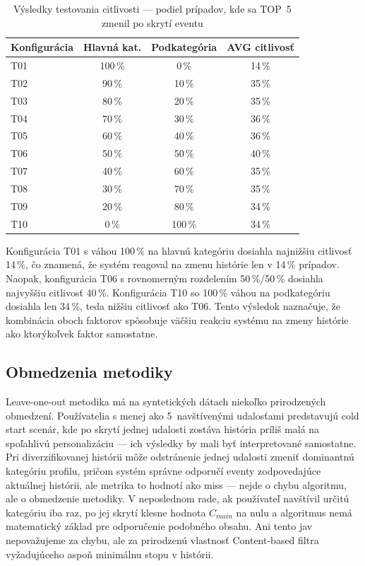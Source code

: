 \begin{table}[h]
\centering
\begin{tabular}{|l|c|c|c|}
\hline
\textbf{Konfigurácia} & \textbf{Hlavná kat.} & \textbf{Podkategória} & \textbf{AVG citlivosť} \\
\hline
T01 & 100\,\% & 0\,\%   & 14\,\% \\
T02 & 90\,\%  & 10\,\%  & 35\,\% \\
T03 & 80\,\%  & 20\,\%  & 35\,\% \\
T04 & 70\,\%  & 30\,\%  & 36\,\% \\
T05 & 60\,\%  & 40\,\%  & 36\,\% \\
T06 & 50\,\%  & 50\,\%  & 40\,\% \\
T07 & 40\,\%  & 60\,\%  & 35\,\% \\
T08 & 30\,\%  & 70\,\%  & 35\,\% \\
T09 & 20\,\%  & 80\,\%  & 34\,\% \\
T10 & 0\,\%   & 100\,\% & 34\,\% \\
\hline
\end{tabular}
\caption{Výsledky testovania citlivosti — podiel prípadov, kde sa TOP~5 zmenil po skrytí eventu}
\label{tab:sensitivity}
\end{table}

Konfigurácia T01 s váhou 100\,\% na hlavnú kategóriu dosiahla najnižšiu citlivosť
14\,\%, čo znamená, že systém reagoval na zmenu histórie len v 14\,\% prípadov.
Naopak, konfigurácia T06 s rovnomerným rozdelením 50\,\%/50\,\% dosiahla najvyššiu
citlivosť 40\,\%. Konfigurácia T10 so 100\,\% váhou na podkategóriu dosiahla len
34\,\%, teda nižšiu citlivosť ako T06. Tento výsledok naznačuje, že kombinácia
oboch faktorov spôsobuje väčšiu reakciu systému na zmeny histórie ako ktorýkoľvek
faktor samostatne.

\subsection{Obmedzenia metodiky}

Leave-one-out metodika má na syntetických dátach niekoľko prirodzených obmedzení.
Používatelia s menej ako 5~navštívenými udalosťami predstavujú cold start scenár,
kde po skrytí jednej udalosti zostáva história príliš malá na spoľahlivú
personalizáciu — ich výsledky by mali byť interpretované samostatne. Pri
diverzifikovanej histórii môže odstránenie jednej udalosti zmeniť dominantnú
kategóriu profilu, pričom systém správne odporučí eventy zodpovedajúce aktuálnej
histórii, ale metrika to hodnotí ako miss — nejde o chybu algoritmu, ale o
obmedzenie metodiky. V neposlednom rade, ak používateľ navštívil určitú kategóriu
iba raz, po jej skrytí klesne hodnota $C_{main}$ na nulu a algoritmus nemá
matematický základ pre odporučenie podobného obsahu. Ani tento jav nepovažujeme
za chybu, ale za prirodzenú vlastnosť Content-based filtra vyžadujúceho aspoň
minimálnu stopu v histórii.

